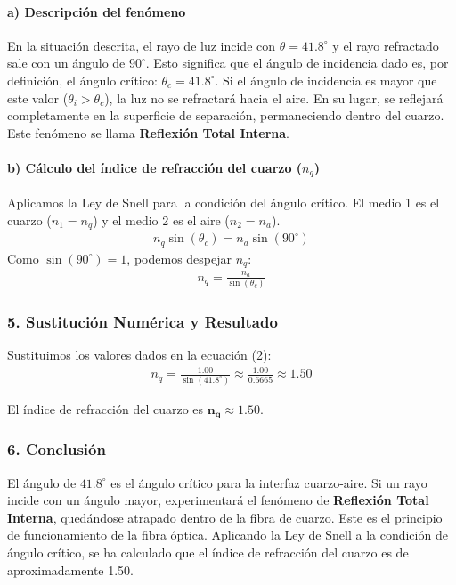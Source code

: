 \paragraph*{a) Descripción del fenómeno}
En la situación descrita, el rayo de luz incide con $\theta = 41.8^\circ$ y el rayo refractado sale con un ángulo de $90^\circ$. Esto significa que el ángulo de incidencia dado es, por definición, el ángulo crítico: $\theta_c = 41.8^\circ$.
Si el ángulo de incidencia es mayor que este valor ($\theta_i > \theta_c$), la luz no se refractará hacia el aire. En su lugar, se reflejará completamente en la superficie de separación, permaneciendo dentro del cuarzo. Este fenómeno se llama \textbf{Reflexión Total Interna}.

\paragraph*{b) Cálculo del índice de refracción del cuarzo ($n_q$)}
Aplicamos la Ley de Snell para la condición del ángulo crítico. El medio 1 es el cuarzo ($n_1=n_q$) y el medio 2 es el aire ($n_2=n_a$).
\begin{gather}
    n_q \sin(\theta_c) = n_a \sin(90^\circ)
\end{gather}
Como $\sin(90^\circ)=1$, podemos despejar $n_q$:
\begin{gather}
    n_q = \frac{n_a}{\sin(\theta_c)}
\end{gather}

\subsubsection*{5. Sustitución Numérica y Resultado}
Sustituimos los valores dados en la ecuación (2):
\begin{gather}
    n_q = \frac{1.00}{\sin(41.8^\circ)} \approx \frac{1.00}{0.6665} \approx 1.50
\end{gather}
\begin{cajaresultado}
    El índice de refracción del cuarzo es $\boldsymbol{n_q \approx 1.50}$.
\end{cajaresultado}

\subsubsection*{6. Conclusión}
\begin{cajaconclusion}
El ángulo de $41.8^\circ$ es el ángulo crítico para la interfaz cuarzo-aire. Si un rayo incide con un ángulo mayor, experimentará el fenómeno de \textbf{Reflexión Total Interna}, quedándose atrapado dentro de la fibra de cuarzo. Este es el principio de funcionamiento de la fibra óptica. Aplicando la Ley de Snell a la condición de ángulo crítico, se ha calculado que el índice de refracción del cuarzo es de aproximadamente 1.50.
\end{cajaconclusion}

